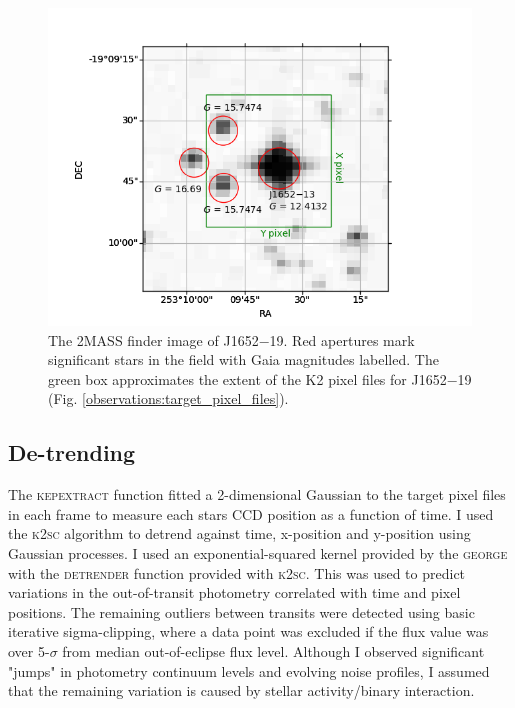 \begin{figure}
    \centering
    \includegraphics{6-images/J1652.png}
    \caption{The 2MASS finder image of J1652$-$19. Red apertures mark significant stars in the field with Gaia magnitudes labelled. The green box approximates the extent of the K2 pixel files for J1652$-$19 (Fig. \ref{observations:target_pixel_files}).}
    \label{observations:J1652}
\end{figure}




\subsection{De-trending}\label{observations:K2:detrending}

The \textsc{kepextract} function fitted a 2-dimensional Gaussian to the target pixel files in each frame to measure each stars CCD position as a function of time. I used the \textsc{k2sc} algorithm \citep{2016MNRAS.459.2408A} to detrend against time, x-position and y-position using Gaussian processes. I used an exponential-squared kernel provided by the \textsc{george} with the \textsc{detrender} function \citep{hodlr} provided with \textsc{k2sc}. This was used to predict variations in the out-of-transit photometry correlated with time and pixel positions. The remaining outliers between transits were detected using basic iterative sigma-clipping, where a data point was excluded if the flux value was over 5-$\sigma$ from median out-of-eclipse flux level. Although I observed significant "jumps" in photometry continuum levels and evolving noise profiles, I assumed that the remaining variation is caused by stellar activity/binary interaction.

